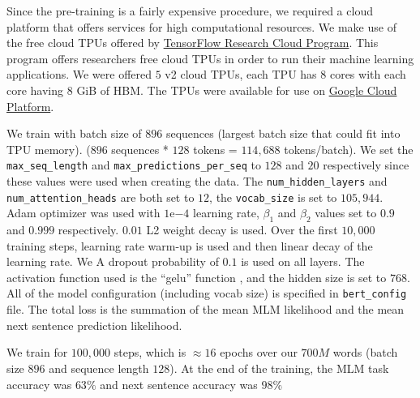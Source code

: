 Since the pre-training is a fairly expensive procedure, we required a cloud platform that offers services for high computational resources. We make use of the free cloud \ac{TPU}s offered by \href{https://www.tensorflow.org/tfrc}{TensorFlow Research Cloud Program}. This program offers researchers free cloud \ac{TPU}s in order to run their machine learning applications. We were offered $5$ v2 cloud \ac{TPU}s, each \ac{TPU} has $8$ cores with each core having $8$ GiB of \ac{HBM}. The \ac{TPU}s were available for use on \href{https://cloud.google.com/}{Google Cloud Platform}.

We train with batch size of $896$ sequences (largest batch size that could fit into \ac{TPU} memory). ($896$ sequences * $128$ tokens = $114,688$ tokens/batch). We set the \texttt{max\_seq\_length} and \texttt{max\_predictions\_per\_seq} to $128$ and $20$ respectively since these values were used when creating the data. The \texttt{num\_hidden\_layers} and \texttt{num\_attention\_heads} are both set to $12$, the \texttt{vocab\_size} is set to $105,944$. Adam optimizer \cite{kingma2014adam} was used with $1\mathrm{e}{-4}$ learning rate, $\beta_1$ and $\beta_2$ values set to $0.9$ and $0.999$ respectively. $0.01$ L2 weight decay is used. Over the first $10,000$ training steps, learning rate warm-up is used and then linear decay of the learning rate.  We A dropout probability of $0.1$ is used on all layers. The activation function used is the \enquote{gelu} function \cite{hendrycks2016bridging}, and the hidden size is set to $768$. All of the model configuration (including vocab size) is specified in \texttt{bert\_config} file. The total loss is the summation of the mean \ac{MLM} likelihood and the mean next sentence prediction likelihood.


We train for $100,000$ steps, which is $\approx 16$ epochs over our $700M$ words (batch size $896$ and sequence length $128$). At the end of the training, the \ac{MLM} task accuracy was $63\%$ and next sentence accuracy was $98\%$ 


 


